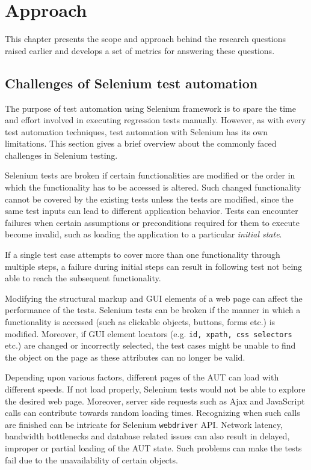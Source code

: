\chapter{Approach} %

\label{Chapter3} %


This chapter presents the scope and approach behind the research questions raised earlier and develops a set of metrics for answering these questions.

\section{Challenges of Selenium test automation}
\label{challengesSelenium}
The purpose of test automation using Selenium framework is to spare the time and effort involved in executing regression tests manually. However, as with every test automation techniques, test automation with Selenium has its own limitations. This section gives a brief overview about the commonly faced challenges in Selenium testing.

Selenium tests are broken if certain functionalities are modified or the order in which the functionality has to be accessed is altered.
Such changed functionality cannot be covered by the existing tests unless the tests are modified, since the same test inputs can lead to different application behavior. Tests can encounter failures when certain assumptions or preconditions required for them to execute become invalid, such as loading the application to a particular \textit{initial state}.

If a single test case attempts to cover more than one functionality through multiple steps, a failure during initial steps can result in following test not being able to reach the subsequent functionality.

Modifying the structural markup and GUI elements of a web page can affect the performance of the tests. Selenium tests can be broken if the manner in which a functionality is accessed (such as clickable objects, buttons, forms etc.) is modified. Moreover, if GUI element locators (e.g. \texttt{id, xpath, css selectors} etc.) are changed or incorrectly selected, the test cases might be unable to find the object on the page as these attributes can no longer be valid.

Depending upon various factors, different pages of the AUT can load with different speeds. If not load properly, Selenium tests would not be able to explore the desired web page. Moreover, server side requests such as Ajax and JavaScript calls can contribute towards random loading times. Recognizing when such calls are finished can be intricate for Selenium \texttt{webdriver} API. Network latency, bandwidth bottlenecks and database related issues can also result in delayed, improper or partial loading of the AUT state. Such problems can make the tests fail due to the unavailability of certain objects.

